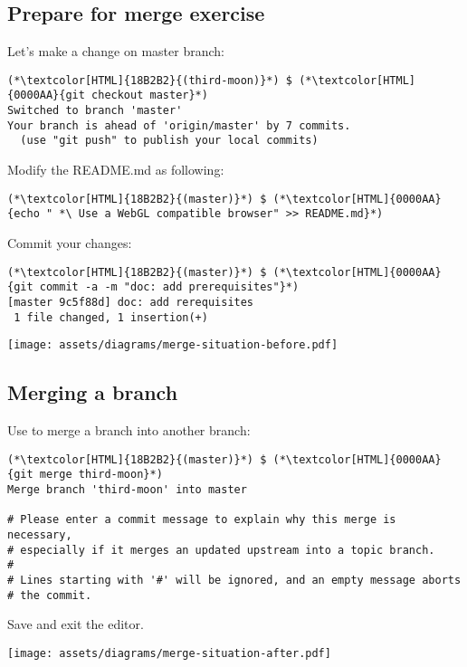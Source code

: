 \subsection{Prepare for merge exercise}
\begin{frame}[fragile]
  \subslidetitle

  Let's make a change on master branch:
  \begin{lstlisting}
(*\textcolor[HTML]{18B2B2}{(third-moon)}*) $ (*\textcolor[HTML]{0000AA}{git checkout master}*)
Switched to branch 'master'
Your branch is ahead of 'origin/master' by 7 commits.
  (use "git push" to publish your local commits)
\end{lstlisting}

  Modify the README.md as following:
  \begin{lstlisting}
(*\textcolor[HTML]{18B2B2}{(master)}*) $ (*\textcolor[HTML]{0000AA}{echo " *\ Use a WebGL compatible browser" >> README.md}*)
\end{lstlisting}

  Commit your changes:
  \begin{lstlisting}
(*\textcolor[HTML]{18B2B2}{(master)}*) $ (*\textcolor[HTML]{0000AA}{git commit -a -m "doc: add prerequisites"}*)
[master 9c5f88d] doc: add rerequisites
 1 file changed, 1 insertion(+)
\end{lstlisting}

  \centerline{\texttt{[image: assets/diagrams/merge-situation-before.pdf]}}

\end{frame}

\subsection{Merging a branch}
\begin{frame}[fragile]
  \subslidetitle

  Use  to merge a branch into another branch:

  \begin{lstlisting}
(*\textcolor[HTML]{18B2B2}{(master)}*) $ (*\textcolor[HTML]{0000AA}{git merge third-moon}*)
Merge branch 'third-moon' into master

# Please enter a commit message to explain why this merge is necessary,
# especially if it merges an updated upstream into a topic branch.
#
# Lines starting with '#' will be ignored, and an empty message aborts
# the commit.
\end{lstlisting}

  Save and exit the editor.
  \centerline{\texttt{[image: assets/diagrams/merge-situation-after.pdf]}}

\end{frame}

